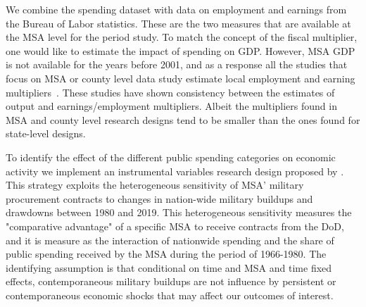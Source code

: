 \documentclass[dv_diss_main.tex]{subfiles}
\begin{document}
We combine the spending dataset with data on employment and earnings from the Bureau of Labor statistics. These are the two measures that are available at the MSA level for the period study. To match the concept of the fiscal multiplier, one would like to estimate the impact of spending on GDP. However, MSA GDP is not available for the years before 2001, and as a response all the studies that focus on MSA or county level data study estimate local employment and earning multipliers~\citep{suarez2016estimating,Auerbach2019,dupor2017local,Demyanyk2019}. These studies have shown consistency between the estimates of output and earnings/employment multipliers. Albeit the multipliers found in MSA and county level research designs tend to be smaller than the ones found for state-level designs. 

To identify the effect of the different public spending categories on economic activity we implement an instrumental variables research design proposed by \cite{Nakamura2014}. This strategy exploits the heterogeneous sensitivity of MSA' military procurement contracts to changes in nation-wide military buildups and drawdowns between 1980 and 2019. This heterogeneous sensitivity measures the "comparative advantage" of a specific MSA to receive contracts from the DoD, and it is measure as the interaction of nationwide spending and the share of public spending received by the MSA during the period of 1966-1980. The identifying assumption is that conditional on time and MSA and time fixed effects, contemporaneous military buildups are not influence by persistent or contemporaneous economic shocks that may affect our outcomes of interest. 

\end{document}
